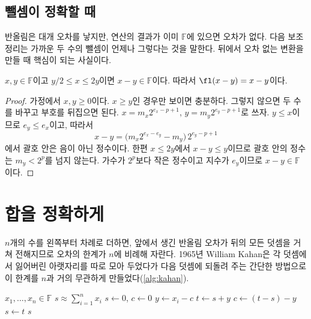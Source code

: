 \subsection{뺄셈이 정확할 때}

반올림은 대개 오차를 낳지만, 연산의 결과가 이미 $\mathbb{F}$에 있으면 오차가 없다. 다음 보조정리는 가까운 두 수의 뺄셈이 언제나 그렇다는 것을 말한다. 뒤에서 오차 없는 변환을 만들 때 핵심이 되는 사실이다.

\begin{lemma}[Sterbenz]
\label{lem:sterbenz}
$x,y\in\mathbb{F}$이고 $y/2\le x\le 2y$이면 $x-y\in\mathbb{F}$이다. 따라서 $\fl(x-y)=x-y$이다.
\end{lemma}

\begin{proof}
가정에서 $x,y\ge0$이다. $x\ge y$인 경우만 보이면 충분하다. 그렇지 않으면 두 수를 바꾸고 부호를 뒤집으면 된다. $x=m_x2^{e_x-p+1}$, $y=m_y2^{e_y-p+1}$로 쓰자. $y\le x$이므로 $e_y\le e_x$이고, 따라서
\[
x-y=\bigl(m_x2^{e_x-e_y}-m_y\bigr)\,2^{e_y-p+1}
\]
에서 괄호 안은 음이 아닌 정수이다. 한편 $x\le2y$에서 $x-y\le y$이므로 괄호 안의 정수는 $m_y<2^{p}$를 넘지 않는다. 가수가 $2^{p}$보다 작은 정수이고 지수가 $e_y$이므로 $x-y\in\mathbb{F}$이다.
\end{proof}

\section{합을 정확하게}
\label{sec:summation}

$n$개의 수를 왼쪽부터 차례로 더하면, 앞에서 생긴 반올림 오차가 뒤의 모든 덧셈을 거쳐 전해지므로 오차의 한계가 $n$에 비례해 자란다. 1965년 William Kahan은 각 덧셈에서 잃어버린 아랫자리를 따로 모아 두었다가 다음 덧셈에 되돌려 주는 간단한 방법으로 이 한계를 $n$과 거의 무관하게 만들었다(\cref{alg:kahan}).

\begin{algorithm}[t]
\caption{Kahan의 보정 합}
\label{alg:kahan}
\begin{algorithmic}[1]
\Require $x_1,\ldots,x_n\in\mathbb{F}$
\Ensure $s\approx\sum_{i=1}^{n}x_i$
\State $s\gets0$, $c\gets0$ 
  \State $y\gets x_i-c$ 
  \State $t\gets s+y$ 
  \State $c\gets(t-s)-y$ 
  \State $s\gets t$
\EndFor
\State \Return $s$
\end{algorithmic}
\end{algorithm}

